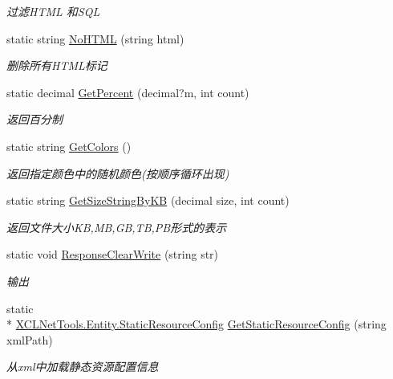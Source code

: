 \begin{DoxyCompactItemize}
\begin{DoxyCompactList}\small\item\em 过滤\-H\-T\-M\-L 和\-S\-Q\-L \end{DoxyCompactList}\item 
static string \hyperlink{class_x_c_l_net_tools_1_1_string_hander_1_1_common_a7879e3cc9494f80e00f989cec68122e7}{No\-H\-T\-M\-L} (string html)
\begin{DoxyCompactList}\small\item\em 删除所有\-H\-T\-M\-L标记 \end{DoxyCompactList}\item 
static decimal \hyperlink{class_x_c_l_net_tools_1_1_string_hander_1_1_common_aeb6c0ff6a876aa51db57e41700becc5c}{Get\-Percent} (decimal?m, int count)
\begin{DoxyCompactList}\small\item\em 返回百分制 \end{DoxyCompactList}\item 
static string \hyperlink{class_x_c_l_net_tools_1_1_string_hander_1_1_common_aade096b0fde1e9153f2b8fa0caadc475}{Get\-Colors} ()
\begin{DoxyCompactList}\small\item\em 返回指定颜色中的随机颜色(按顺序循环出现) \end{DoxyCompactList}\item 
static string \hyperlink{class_x_c_l_net_tools_1_1_string_hander_1_1_common_a4e1ade8275f7aaca63be7a5af1d5f507}{Get\-Size\-String\-By\-K\-B} (decimal size, int count)
\begin{DoxyCompactList}\small\item\em 返回文件大小\-K\-B,M\-B,G\-B,T\-B,P\-B形式的表示 \end{DoxyCompactList}\item 
static void \hyperlink{class_x_c_l_net_tools_1_1_string_hander_1_1_common_a9a36061254c3ec3898e45ade6193c745}{Response\-Clear\-Write} (string str)
\begin{DoxyCompactList}\small\item\em 输出 \end{DoxyCompactList}\item 
static \\*
\hyperlink{class_x_c_l_net_tools_1_1_entity_1_1_static_resource_config}{X\-C\-L\-Net\-Tools.\-Entity.\-Static\-Resource\-Config} \hyperlink{class_x_c_l_net_tools_1_1_string_hander_1_1_common_a67eca9ff4f18688db0b27ad91cb87ed9}{Get\-Static\-Resource\-Config} (string xml\-Path)
\begin{DoxyCompactList}\small\item\em 从xml中加载静态资源配置信息 \end{DoxyCompactList}\item 

\end{DoxyCompactItemize}
